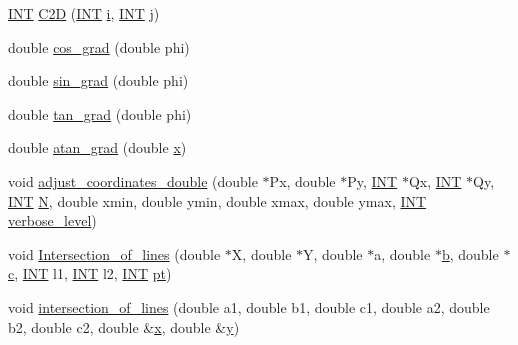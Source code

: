 \begin{DoxyCompactItemize}
\item 
\mbox{\hyperlink{galois_8h_a09fddde158a3a20bd2dcadb609de11dc}{I\+NT}} \mbox{\hyperlink{draw_8_c_a9967f312a1438b2539cc5375207ee35a}{C2D}} (\mbox{\hyperlink{galois_8h_a09fddde158a3a20bd2dcadb609de11dc}{I\+NT}} \mbox{\hyperlink{alphabet2_8_c_acb559820d9ca11295b4500f179ef6392}{i}}, \mbox{\hyperlink{galois_8h_a09fddde158a3a20bd2dcadb609de11dc}{I\+NT}} \mbox{\hyperlink{alphabet2_8_c_a37d972ae0b47b9099e30983131d31916}{j}})
\item 
double \mbox{\hyperlink{draw_8_c_a697caa38872ad187ca39f8b113d76683}{cos\+\_\+grad}} (double phi)
\item 
double \mbox{\hyperlink{draw_8_c_a3d18fbbffa625ae13c280711f2e183e6}{sin\+\_\+grad}} (double phi)
\item 
double \mbox{\hyperlink{draw_8_c_af91d2a89430df0035eb42a7976a13a07}{tan\+\_\+grad}} (double phi)
\item 
double \mbox{\hyperlink{draw_8_c_a35587acf2bcdaef3d9bccf0ba897eec1}{atan\+\_\+grad}} (double \mbox{\hyperlink{alphabet2_8_c_a6150e0515f7202e2fb518f7206ed97dc}{x}})
\item 
void \mbox{\hyperlink{draw_8_c_a12e1a9ddeefb634f38969b5839d73680}{adjust\+\_\+coordinates\+\_\+double}} (double $\ast$Px, double $\ast$Py, \mbox{\hyperlink{galois_8h_a09fddde158a3a20bd2dcadb609de11dc}{I\+NT}} $\ast$Qx, \mbox{\hyperlink{galois_8h_a09fddde158a3a20bd2dcadb609de11dc}{I\+NT}} $\ast$Qy, \mbox{\hyperlink{galois_8h_a09fddde158a3a20bd2dcadb609de11dc}{I\+NT}} \mbox{\hyperlink{_a_p_p_s_2_t_d_o_2packing_8_c_a0240ac851181b84ac374872dc5434ee4}{N}}, double xmin, double ymin, double xmax, double ymax, \mbox{\hyperlink{galois_8h_a09fddde158a3a20bd2dcadb609de11dc}{I\+NT}} \mbox{\hyperlink{simeon_8_c_a818073fbcc2f439e7c56952f67386122}{verbose\+\_\+level}})
\item 
void \mbox{\hyperlink{draw_8_c_a3d6993d94efaf05c00155047dd36d35b}{Intersection\+\_\+of\+\_\+lines}} (double $\ast$X, double $\ast$Y, double $\ast$a, double $\ast$\mbox{\hyperlink{alphabet2_8_c_a148e3876077787926724625411d6e7a9}{b}}, double $\ast$\mbox{\hyperlink{alphabet2_8_c_a4e1e0e72dd773439e333c84dd762a9c3}{c}}, \mbox{\hyperlink{galois_8h_a09fddde158a3a20bd2dcadb609de11dc}{I\+NT}} l1, \mbox{\hyperlink{galois_8h_a09fddde158a3a20bd2dcadb609de11dc}{I\+NT}} l2, \mbox{\hyperlink{galois_8h_a09fddde158a3a20bd2dcadb609de11dc}{I\+NT}} \mbox{\hyperlink{clique__finder_8_c_aec1f1a2b30fdca8844c2932384483145}{pt}})
\item 
void \mbox{\hyperlink{draw_8_c_a8e5b79dda93db3b0b557c5e78ccec99d}{intersection\+\_\+of\+\_\+lines}} (double a1, double b1, double c1, double a2, double b2, double c2, double \&\mbox{\hyperlink{alphabet2_8_c_a6150e0515f7202e2fb518f7206ed97dc}{x}}, double \&\mbox{\hyperlink{alphabet2_8_c_a0a2f84ed7838f07779ae24c5a9086d33}{y}})

\end{DoxyCompactItemize}
